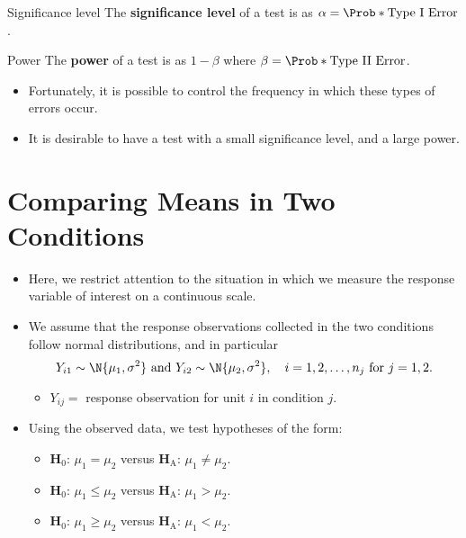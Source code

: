 \begin{Definition}{Significance level}{}
    The \textbf{significance level} of a test is as $ \alpha=\Prob*{\text{Type I Error}} $.
\end{Definition}
\begin{Definition}{Power}{}
    The \textbf{power} of a test is as $ 1-\beta $ where
    $ \beta=\Prob*{\text{Type II Error}} $.
\end{Definition}
\begin{itemize}
    \item Fortunately, it is possible to control the frequency in which these types of errors
          occur.
    \item It is desirable to have a test with a small significance level, and a large power.
\end{itemize}
\section{Comparing Means in Two Conditions}
\begin{itemize}
    \item Here, we restrict attention to the situation in which we measure the response variable
          of interest on a continuous scale.
    \item We assume that the response observations collected in the two conditions follow normal
          distributions, and in particular
          \[ Y_{i1}\sim \N{\mu_1,\sigma^2}\text{ and }Y_{i2} \sim \N{\mu_2,\sigma^2},\quad i=1,2,\ldots,n_j\text{ for } j=1,2. \]
          \begin{itemize}
              \item $ Y_{ij}= $ response observation for unit $ i $ in condition $ j $.
          \end{itemize}
    \item Using the observed data, we test hypotheses of the form:
          \begin{itemize}
              \item $ \mathbf{H}_0 $: $ \mu_1=\mu_2 $ versus $ \mathbf{H}_\text{A} $: $ \mu_1\ne\mu_2 $.
              \item $ \mathbf{H}_0 $: $ \mu_1\le\mu_2 $ versus $ \mathbf{H}_\text{A} $: $ \mu_1>\mu_2 $.
              \item $ \mathbf{H}_0 $: $ \mu_1\ge\mu_2 $ versus $ \mathbf{H}_\text{A} $: $ \mu_1<\mu_2 $.
          \end{itemize}
\end{itemize}

